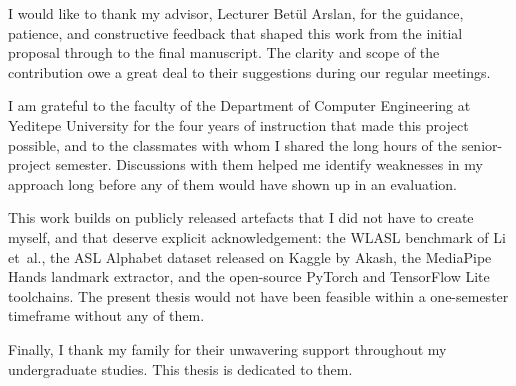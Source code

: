 \begin{acknowledgements}
I would like to thank my advisor, Lecturer Betül Arslan, for the
guidance, patience, and constructive feedback that shaped this
work from the initial proposal through to the final manuscript.
The clarity and scope of the contribution owe a great deal to
their suggestions during our regular meetings.

I am grateful to the faculty of the Department of Computer
Engineering at Yeditepe University for the four years of
instruction that made this project possible, and to the
classmates with whom I shared the long hours of the senior-project
semester. Discussions with them helped me identify weaknesses in
my approach long before any of them would have shown up in an
evaluation.

This work builds on publicly released artefacts that I did not
have to create myself, and that deserve explicit acknowledgement:
the WLASL benchmark of Li et~al., the ASL Alphabet dataset
released on Kaggle by Akash, the MediaPipe Hands landmark
extractor, and the open-source PyTorch and TensorFlow Lite
toolchains. The present thesis would not have been feasible
within a one-semester timeframe without any of them.

Finally, I thank my family for their unwavering support
throughout my undergraduate studies. This thesis is dedicated to
them.
\end{acknowledgements}
